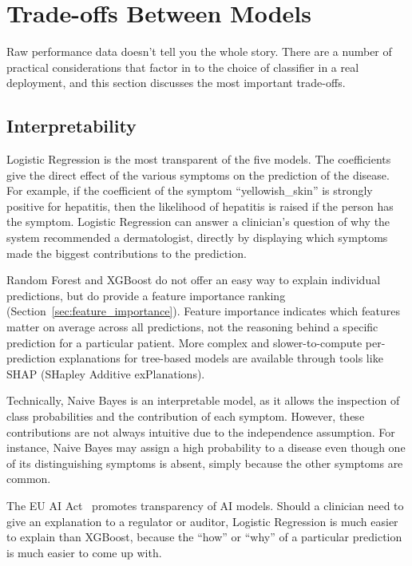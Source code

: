 \section{Trade-offs Between Models}
\label{sec:tradeoffs}

Raw performance data doesn't tell you the whole story. There are a number of practical considerations that factor in to the choice of classifier in a real deployment, and this section discusses the most important trade-offs.

\subsection{Interpretability}

Logistic Regression is the most transparent of the five models. The coefficients give the direct effect of the various symptoms on the prediction of the disease. For example, if the coefficient of the symptom ``yellowish\_skin'' is strongly positive for hepatitis, then the likelihood of hepatitis is raised if the person has the symptom. Logistic Regression can answer a clinician's question of why the system recommended a dermatologist, directly by displaying which symptoms made the biggest contributions to the prediction.

Random Forest and XGBoost do not offer an easy way to explain individual predictions, but do provide a feature importance ranking (Section~\ref{sec:feature_importance}). Feature importance indicates which features matter on average across all predictions, not the reasoning behind a specific prediction for a particular patient. More complex and slower-to-compute per-prediction explanations for tree-based models are available through tools like SHAP (SHapley Additive exPlanations).

Technically, Naive Bayes is an interpretable model, as it allows the inspection of class probabilities and the contribution of each symptom. However, these contributions are not always intuitive due to the independence assumption. For instance, Naive Bayes may assign a high probability to a disease even though one of its distinguishing symptoms is absent, simply because the other symptoms are common.

The EU AI Act~\citep{EUAI2024} promotes transparency of AI models. Should a clinician need to give an explanation to a regulator or auditor, Logistic Regression is much easier to explain than XGBoost, because the ``how'' or ``why'' of a particular prediction is much easier to come up with.

